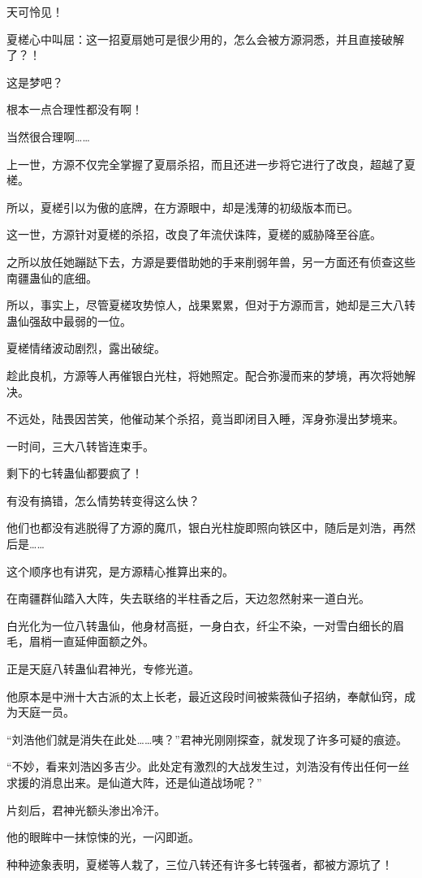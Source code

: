 \begin{this_body}
天可怜见！

夏槎心中叫屈：这一招夏扇她可是很少用的，怎么会被方源洞悉，并且直接破解了？！

这是梦吧？

根本一点合理性都没有啊！

当然很合理啊……

上一世，方源不仅完全掌握了夏扇杀招，而且还进一步将它进行了改良，超越了夏槎。

所以，夏槎引以为傲的底牌，在方源眼中，却是浅薄的初级版本而已。

这一世，方源针对夏槎的杀招，改良了年流伏诛阵，夏槎的威胁降至谷底。

之所以放任她蹦跶下去，方源是要借助她的手来削弱年兽，另一方面还有侦查这些南疆蛊仙的底细。

所以，事实上，尽管夏槎攻势惊人，战果累累，但对于方源而言，她却是三大八转蛊仙强敌中最弱的一位。

夏槎情绪波动剧烈，露出破绽。

趁此良机，方源等人再催银白光柱，将她照定。配合弥漫而来的梦境，再次将她解决。

不远处，陆畏因苦笑，他催动某个杀招，竟当即闭目入睡，浑身弥漫出梦境来。

一时间，三大八转皆连束手。

剩下的七转蛊仙都要疯了！

有没有搞错，怎么情势转变得这么快？

他们也都没有逃脱得了方源的魔爪，银白光柱旋即照向铁区中，随后是刘浩，再然后是……

这个顺序也有讲究，是方源精心推算出来的。

在南疆群仙踏入大阵，失去联络的半柱香之后，天边忽然射来一道白光。

白光化为一位八转蛊仙，他身材高挺，一身白衣，纤尘不染，一对雪白细长的眉毛，眉梢一直延伸面额之外。

正是天庭八转蛊仙君神光，专修光道。

他原本是中洲十大古派的太上长老，最近这段时间被紫薇仙子招纳，奉献仙窍，成为天庭一员。

“刘浩他们就是消失在此处……咦？”君神光刚刚探查，就发现了许多可疑的痕迹。

“不妙，看来刘浩凶多吉少。此处定有激烈的大战发生过，刘浩没有传出任何一丝求援的消息出来。是仙道大阵，还是仙道战场呢？”

片刻后，君神光额头渗出冷汗。

他的眼眸中一抹惊悚的光，一闪即逝。

种种迹象表明，夏槎等人栽了，三位八转还有许多七转强者，都被方源坑了！


\end{this_body}
